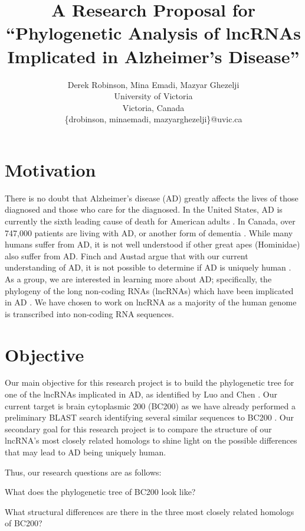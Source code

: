 \documentclass[conference]{IEEEtran}
\title{\vspace{-0.5cm}A Research Proposal for \\``Phylogenetic Analysis of lncRNAs Implicated in Alzheimer's Disease''}
\author{Derek Robinson, Mina Emadi, Mazyar Ghezelji\\
University of Victoria\\
Victoria, Canada \\
\{drobinson, minaemadi, mazyarghezelji\}@uvic.ca}
\begin{document}

\maketitle

\section{Motivation}

There is no doubt that Alzheimer's disease (AD) greatly affects the lives of those diagnosed and those who care for the diagnosed. 
In the United States, AD is currently the sixth leading cause of death for American adults \cite{AlzheimersDisease}. 
In Canada, over 747,000 patients are living with AD, or another form of dementia \cite{ADcanada}. 
While many humans suffer from AD, it is not well understood if other great apes (Hominidae) also suffer from AD. 
Finch and Austad argue that with our current understanding of AD, it is not possible to determine if AD is uniquely human \cite{finch2015commentary}.
As a group, we are interested in learning more about AD; specifically, the phylogeny of the long non-coding RNAs (lncRNAs) which have been implicated in AD \cite{luo2016long}. 
We have chosen to work on lncRNA as a majority of the human genome is transcribed into non-coding RNA sequences.

\section{Objective}

Our main objective for this research project is to build the phylogenetic tree for one of the lncRNAs implicated in AD, as identified by Luo and Chen \cite{luo2016long}. 
Our current target is brain cytoplasmic 200 (BC200) as we have already performed a preliminary BLAST search identifying several similar sequences to BC200 \cite{madden2012blast,blastTool}. 
Our secondary goal for this research project is to compare the structure of our lncRNA's most closely related homologs to shine light on the possible differences that may lead to AD being uniquely human.

Thus, our research questions are as follows:

\begin{questions}
    \item What does the phylogenetic tree of BC200 look like?
    \item What structural differences are there in the three most closely related homologs of BC200?
\end{questions}
\end{document}
